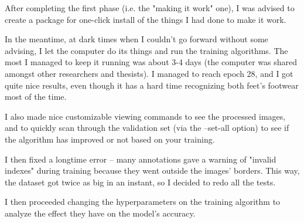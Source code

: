 After completing the first phase (i.e. the "making it work" one), I was advised to create a package for one-click install of the things I had done to make it work.

In the meantime, at dark times when I couldn't go forward without some advising, I let the computer do its things and run the training algorithms. The most I managed to keep it running was about 3-4 days (the computer was shared amongst other researchers and thesists). I managed to reach epoch 28, and I got quite nice results, even though it has a hard time recognizing both feet's footwear most of the time. 

I also made nice customizable viewing commands to see the processed images, and to quickly scan through the validation set (via the --set-all option) to see if the algorithm has improved or not based on your training.

I then fixed a longtime error -- many annotations gave a warning of "invalid indexes" during training because they went outside the images' borders. This way, the dataset got twice as big in an instant, so I decided to redo all the tests.

I then proceeded changing the hyperparameters on the training algorithm to analyze the effect they have on the model's accuracy.